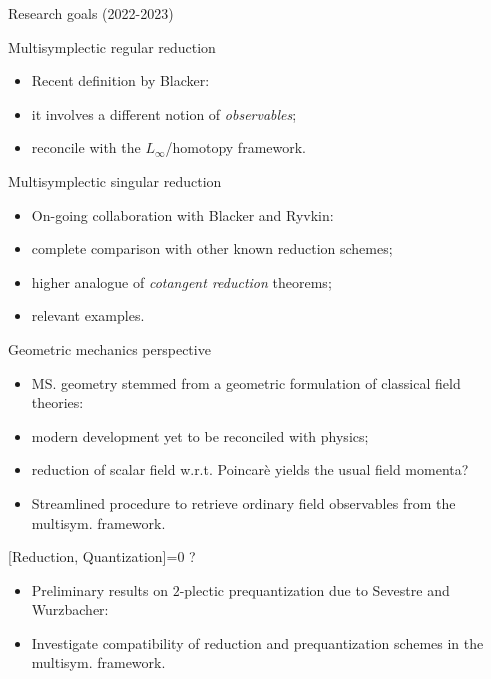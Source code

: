 \documentclass[10pt]{beamer}
\newcommand{\smark}{\textcolor{orange}{\ding{43}}}%
\begin{document}
\begin{frame}{Research goals (2022-2023)}
	\begin{probox}[colback=white]{Multisymplectic regular reduction}
		\begin{itemize}
			\item[\cmark] Recent definition by Blacker:
			\item[\smark] it involves a different notion of \emph{observables};
			\item[\smark] reconcile with the $L_\infty$/homotopy framework.
		\end{itemize}
	\end{probox}
	
	\pause
	\begin{probox}[]{Multisymplectic singular reduction}
		\begin{itemize}
			\item[\cmark] On-going collaboration with Blacker and Ryvkin:
			\item[\smark] complete comparison with other known reduction schemes;
			\item[\smark] higher analogue of \emph{cotangent reduction} theorems;
			\item[\smark] relevant examples.
		\end{itemize}
	\end{probox}

 	\pause
	\begin{probox}[colback=white]{Geometric mechanics perspective}
		\begin{itemize}
			\item[\cmark] MS. geometry stemmed from a geometric formulation of classical field theories:
			\item[\smark] modern development yet to be %
			reconciled with physics;
			\item[\smark] reduction of scalar field w.r.t. Poincarè yields the usual field momenta?
			\item[\smark] Streamlined procedure to retrieve ordinary field observables from the multisym. framework.
		\end{itemize}
	\end{probox}  

	\pause
	\begin{probox}[colbacktitle=yellow!15!white ,colback=yellow!15!white]{{[Reduction, Quantization]=0} ?}
		\begin{itemize}
			\item[\cmark] Preliminary results on $2$-plectic prequantization due to Sevestre and Wurzbacher:
			\item[\smark] Investigate compatibility of reduction and prequantization schemes in the multisym. framework.
		\end{itemize}
	\end{probox}	
\end{frame}
\end{document}
